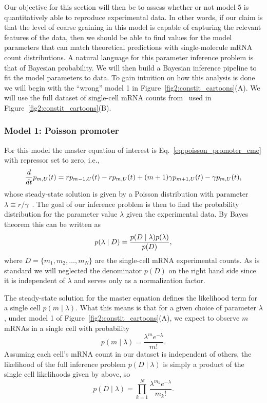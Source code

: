 Our objective for this section will then be to assess whether or not model 5 is
quantitatively able to reproduce experimental data. In other words, if our claim
is that the level of coarse graining in this model is capable of capturing the
relevant features of the data, then we should be able to find values for the
model parameters that can match theoretical predictions with single-molecule
mRNA count distributions. A natural language for this parameter inference
problem is that of Bayesian probability. We will then build a Bayesian inference
pipeline to fit the model parameters to data. To gain intuition on how this
analysis is done we will begin with the ``wrong'' model 1 in
Figure~\ref{fig2:constit_cartoons}(A). We will use the full dataset of
single-cell mRNA counts from~\cite{Jones2014} used in
Figure~\ref{fig2:constit_cartoons}(B).

\subsubsection{Model 1: Poisson promoter}

For this model the master equation of interest is
Eq.~\ref{eq:poisson_promoter_cme} with repressor set to zero, i.e.,
\begin{equation}
{d\over dt}p_{m,U}(t) = 
        rp_{m-1,U}(t) 
        - rp_{m,U}(t)
        + (m+1)\gamma p_{m+1,U}(t) 
        - \gamma p_{m,U}(t),
\end{equation}
whose steady-state solution is given by a Poisson distribution with parameter
$\lambda \equiv r / \gamma$~\cite{Sanchez2013}. The goal of our inference 
problem is then to find the probability distribution for the parameter value
$\lambda$ given the experimental data. By Bayes theorem this can be written as
\begin{equation}
p(\lambda \mid D) = {p(D \mid \lambda) p(\lambda) \over p(D)},
\end{equation}
where $D = \{m_1, m_2, \ldots, m_N \}$ are the single-cell mRNA experimental
counts. As is standard we will neglected the denominator $p(D)$ on the right
hand side since it is independent of $\lambda$ and serves only as a
normalization factor.

The steady-state solution for the master equation defines the likelihood
term for a single cell $p(m \mid \lambda)$. What this means is that for a given
choice of parameter $\lambda$, under model 1 of
Figure~\ref{fig2:constit_cartoons}(A), we expect to observe $m$ mRNAs in a
single cell with probability
\begin{equation}
p(m\mid\lambda) = \frac{\lambda^m e^{-\lambda}}{m!}.
\label{eq:poisson_inference010}
\end{equation}
Assuming each cell's mRNA count in our dataset is independent of others, the
likelihood of the full inference problem $p(D\mid\lambda)$ is simply a product
of the single cell likelihoods given by  above, so
\begin{equation}
p(D\mid\lambda) = \prod_{k=1}^N \frac{\lambda^{m_k}e^{-\lambda}}{m_k!}.
\end{equation}

